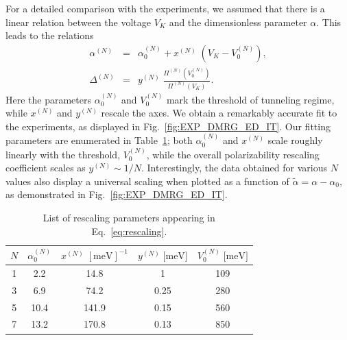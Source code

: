 \documentclass[aps, prb, floatfix, twocolumn, notitlepage, superscriptaddress, 10pt]{revtex4-2}
\newcommand{\red}{\color{red}}
\newcommand{\1}{{1\hspace*{-0.5ex} \textrm{l} \hspace*{0.5ex}}}
\begin{document}
For a detailed comparison with the experiments,  we assumed that  there is a linear relation
between the voltage  $V_K$ and  the dimensionless parameter $\alpha$. This leads to the relations
\begin{eqnarray}
	\alpha^{(N)}  &=& \alpha_0^{(N)} +x^{(N)} \; (V_K - V_{0}^{(N)}),\nonumber\\
	\Delta^{(N)} &=&y^{(N)} \; \frac {\Pi^{(N)}(V_{0}^{(N)})} {\Pi^{(N)} (V_K)} .
	\label{eq:rescaling}
\end{eqnarray}
Here the parameters $\alpha_0^{(N)}$ 
and $V_{0}^{(N)}$ mark the threshold of tunneling regime, while $x^{(N)}$ and $y^{(N)}$ rescale the 
axes. We obtain a remarkably accurate fit
to the experiments, as displayed in Fig.~\ref{fig:EXP_DMRG_ED_IT}. Our fitting parameters are 
 enumerated  in Table~\ref{table:parameters}; both $\alpha_0^{(N)}$ and $x^{(N)}$ scale roughly 
 linearly with the threshold, $V_0^{(N)}$, while the overall  polarizability rescaling coefficient
 scales as $y^{(N)}\sim 1/N$.
 Interestingly, the data obtained for various $N$ values also display  a universal scaling when plotted as a 
function of $\tilde \alpha = \alpha-\alpha_0$, as demonstrated in Fig.~\ref{fig:EXP_DMRG_ED_IT}. 
 
%
%
\begin{table}[t!]
	\begin{tabular}{|c|c|c|c|c|}
	\hline
	$N$ & $\alpha_0^{(N)}$   & $x^{(N)} \; [\text{meV}]^{-1}$ & $y^{(N)}\;\text{[meV]}$ & $V_0^{(N)} \;\text{[meV]}$ \\ \hline
	1 & 2.2 & 14.8   & 1    & 109     \\ \hline
	3 & 6.9  & 74.2  & 0.25 & 280     \\ \hline
	5 & 10.4 & 141.9  & 0.15 & 560    \\ \hline
	7 & 13.2  & 170.8  & 0.13 & 850    \\ \hline
	\end{tabular}
	\caption{List of rescaling parameters appearing in Eq.~\eqref{eq:rescaling}.
	}
	\label{table:parameters}
	\end{table}

%
\end{document}
